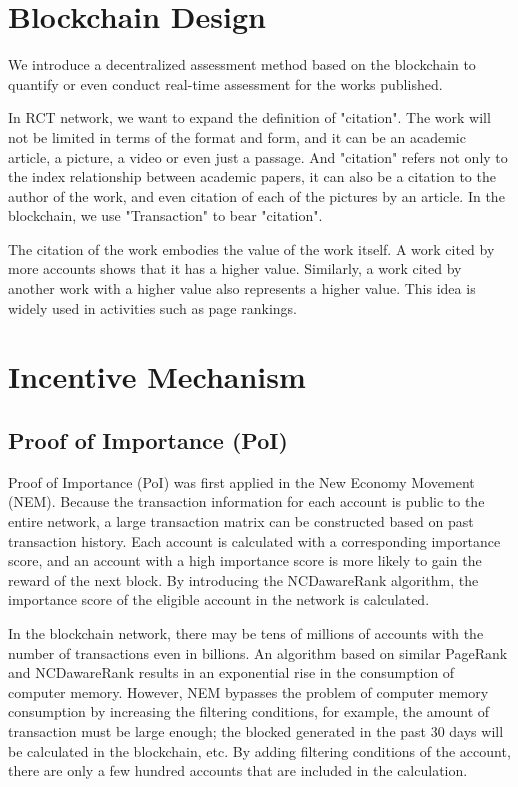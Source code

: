 \documentclass[a4paper,oneside,openany]{tufte-book}
\begin{document}
\section{Blockchain Design}

We introduce a decentralized assessment method based on the blockchain to quantify or even conduct real-time assessment for the works published.



In RCT network, we want to expand the definition of "citation". The work will not be limited in terms of the format and form, and it can be an academic article, a picture, a video or even just a passage. And "citation" refers not only to the index relationship between academic papers, it can also be a citation to the author of the work, and even citation of each of the pictures by an article. In the blockchain, we use "Transaction" to bear "citation".


The citation of the work embodies the value of the work itself. A work cited by more accounts shows that it has a higher value. Similarly, a work cited by another work with a higher value also represents a higher value. This idea is widely used in activities such as page rankings.




\section{Incentive Mechanism}


\subsection{Proof of Importance (PoI)}

Proof of Importance (PoI) was first applied in the New Economy Movement (NEM). Because the transaction information for each account is public to the entire network, a large transaction matrix can be constructed based on past transaction history. Each account is calculated with a corresponding importance score, and an account with a high importance score is more likely to gain the reward of the next block. By introducing the NCDawareRank algorithm, the importance score of the eligible account in the network is calculated.





In the blockchain network, there may be tens of millions of accounts with the number of transactions even in billions. An algorithm based on similar PageRank and NCDawareRank results in an exponential rise in the consumption of computer memory. However, NEM bypasses the problem of computer memory consumption by increasing the filtering conditions, for example, the amount of transaction must be large enough; the blocked generated in the past 30 days will be calculated in the blockchain, etc. By adding filtering conditions of the account, there are only a few hundred accounts that are included in the calculation.
\end{document}
